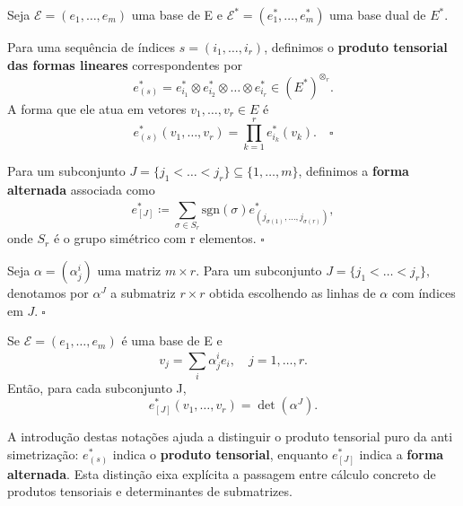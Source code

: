 \documentclass[../differential_forms.tex]{subfiles}
\begin{document}
Seja \(\mathcal{E}=(e_1,\dotsc , e_{m})\) uma base de E e \(\mathcal{E}^{*} = (e_{1}^{*}, \dotsc , e_{m}^{*})\) uma base dual de \(E^{*}.\)
\begin{def*}
	Para uma sequência de índices \(s=(i_1,\dotsc ,i_r)\), definimos o \textbf{produto tensorial das formas lineares} correspondentes por
	\[
		e_{(s)}^{*} = e_{i_1}^{*}\otimes e_{i_2}^{*}\otimes \dotsc \otimes e_{i_r}^{*}\in (E^{*})^{\otimes_r}.
	\]
	A forma que ele atua em vetores \(v_1,\dotsc ,v_r\in E\) é
	\[
		e_{(s)}^{*} (v_1,\dotsc ,v_r) = \prod\limits_{k=1}^{r}e_{i_k}^{*}(v_{k}). \quad \square
	\]
\end{def*}
\begin{def*}
	Para um subconjunto \(J=\{j_1<\dotsc <j_r\}\subseteq \{1,\dotsc ,m\}\), definimos a \textbf{forma alternada} associada como
	\[
		e_{[J]}^{*} \coloneqq \sum\limits_{\sigma \in S_{r}}^{} \mathrm{sgn}(\sigma )e_{(j_{\sigma (1)}, \dotsc , j_{\sigma (r)})}^{*},
	\]
	onde \(S_r\) é o grupo simétrico com r elementos. \(\square\)
\end{def*}
\begin{def*}
	Seja \(\alpha = (\alpha_{j}^{i})\) uma matriz \(m\times r\). Para um subconjunto \(J=\{j_1<\dotsc <j_r\},\) denotamos por \(\alpha^{J}\) a submatriz \(r\times r\) obtida escolhendo as linhas de \(\alpha \) com índices em \(J.\; \square\)
\end{def*}
\begin{prop*}
	Se \(\mathcal{E}=(e_1,\dotsc , e_{m})\) é uma base de E e
	\[
		v_{j} = \sum\limits_{i}^{}\alpha_{j}^{i}e_{i},\quad j=1,\dotsc ,r.
	\]
	Então, para cada subconjunto J,
	\[
		e_{[J]}^{*}(v_1,\dotsc , v_r) = \det{(\alpha^{J})}.
	\]
\end{prop*}
\begin{tcolorbox}[
		skin=enhanced,
		title=Observação,
		fonttitle=\bfseries,
		colframe=black,
		colbacktitle=cyan!75!white,
		colback=cyan!15,
		colbacklower=black,
		coltitle=black,
		drop fuzzy shadow,
	]
	A introdução destas notações ajuda a distinguir o produto tensorial puro da anti simetrização:  \(e_{(s)}^{*}\) indica o \textbf{produto tensorial}, enquanto \(e_{[J]}^{*}\) indica a \textbf{forma alternada}. Esta distinção eixa explícita a passagem entre cálculo concreto de produtos tensoriais e determinantes de submatrizes.
\end{tcolorbox}
\end{document}
